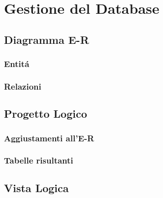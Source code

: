 \section{Gestione del Database}
\subsection{Diagramma E-R}
\subsubsection{Entit\'a}
\subsubsection{Relazioni}
\subsection{Progetto Logico}
\subsubsection{Aggiustamenti all'E-R}
\subsubsection{Tabelle risultanti}
\subsection{Vista Logica}